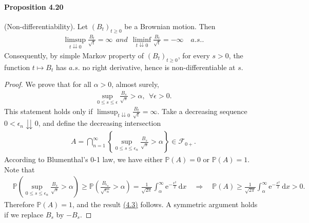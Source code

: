 \documentclass{article}
\numberwithin{equation}{section}
\newcommand{\e}{\mathrm{e}}
\renewcommand{\P}{\mathbb{P}}
\renewcommand{\d}{\mathrm{d}}
\theoremstyle{plain}
\theoremstyle{definition}
\begin{document}
\paragraph{Proposition 4.20\label{prop:4.20}} (Non-differentiability). Let $(B_t)_{t\geq 0}$ be a Brownian motion. Then
\begin{align*}
	\limsup_{t\downdownarrows 0}\frac{B_t}{\sqrt{t}}=\infty\ \ \textit{and}\ \ \liminf_{t\downdownarrows 0}\frac{B_t}{\sqrt{t}}=-\infty\quad a.s..
\end{align*}
Consequently, by simple Markov property of $(B_t)_{t\geq 0}$, for every $s>0$, the function $t\mapsto B_t$ has $a.s.$ no right derivative, hence is non-differentiable at $s$.
\begin{proof}
We prove that for all $\alpha>0$, almost surely,
\begin{align*}
	\sup_{0\leq s\leq\epsilon}\frac{B_s}{\sqrt{s}}>\alpha,\ \ \forall \epsilon>0.\tag{4.3}\label{eq:4.3}
\end{align*}
This statement holds only if $\limsup_{t\downdownarrows 0}\frac{B_t}{\sqrt{t}}=\infty$. Take a decreasing sequence $0<\epsilon_n\downdownarrows 0$, and define the decreasing intersection
\begin{align*}
	A=\bigcap_{n=1}^\infty\left\{\sup_{0\leq s\leq\epsilon_n}\frac{B_s}{\sqrt{s}}>\alpha\right\}\in\mathscr{F}_{0+}.
\end{align*}
According to Blumenthal's 0-1 law, we have either $\P(A)=0$ or $\P(A)=1$. Note that
\begin{align*}
	&\P\left(\sup_{0\leq s\leq\epsilon_n}\frac{B_s}{\sqrt{s}}>\alpha\right)\geq \P\left(\frac{B_{\epsilon_n}}{\sqrt{\epsilon_n}}>\alpha\right)=\frac{1}{\sqrt{2\pi}}\int_\alpha^\infty\e^{-\frac{x^2}{2}}\,\d x\quad\Rightarrow\quad \P(A)\geq \frac{1}{\sqrt{2\pi}}\int_\alpha^\infty\e^{-\frac{x^2}{2}}\,\d x>0.
\end{align*}
Therefore $\P(A)=1$, and the result \hyperref[eq:4.3]{(4.3)} follows. A symmetric argument holds if we replace $B_s$ by $-B_s$.
\end{proof}
\end{document}
